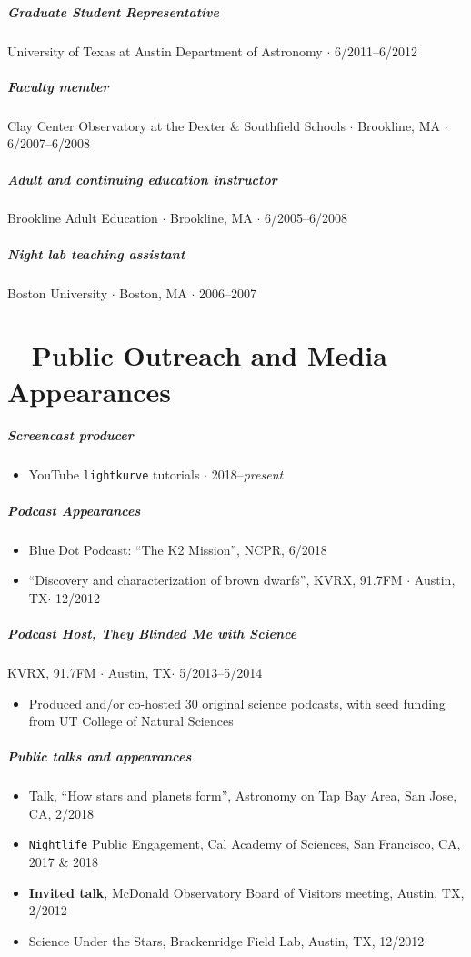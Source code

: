 \documentclass[10pt,letterpaper]{article}
\begin{document}
\subparagraph{Graduate Student Representative}
University of Texas at Austin Department of Astronomy $\cdot$ 6/2011--6/2012

\subparagraph{Faculty member}
Clay Center Observatory at the Dexter \& Southfield Schools  $\cdot$ Brookline, MA $\cdot$ 6/2007--6/2008

\subparagraph{Adult and continuing education instructor}
Brookline Adult Education  $\cdot$ Brookline, MA $\cdot$ 6/2005--6/2008

\subparagraph{Night lab teaching assistant}
Boston University $\cdot$ Boston, MA $\cdot$ 2006--2007

\section*{\faYoutubePlay ~ Public Outreach and Media Appearances}

\subparagraph{Screencast producer}
	\begin{itemize}
      \item YouTube \texttt{lightkurve} tutorials $\cdot$ 2018--\emph{present}
	\end{itemize}


\subparagraph{Podcast Appearances}
	\begin{itemize}
      \item Blue Dot Podcast: ``The K2 Mission'', NCPR, 6/2018
      \item ``Discovery and characterization of brown dwarfs'', KVRX, 91.7FM $\cdot$ Austin, TX$\cdot$ 12/2012
	\end{itemize}

\subparagraph{Podcast Host, \emph{They Blinded Me with Science} }
KVRX, 91.7FM $\cdot$ Austin, TX$\cdot$ 5/2013--5/2014
	\begin{itemize}
	    \item Produced and/or co-hosted 30 original science podcasts, with seed funding from UT College of Natural Sciences
	\end{itemize}

\subparagraph{Public talks and appearances}
	\begin{itemize}
    \item Talk, ``How stars and planets form'', Astronomy on Tap Bay Area, San Jose, CA, 2/2018
    \item \texttt{Nightlife} Public Engagement, Cal Academy of Sciences, San Francisco, CA, 2017 \& 2018
    \item \textbf{Invited talk}, McDonald Observatory Board of Visitors meeting, Austin, TX, 2/2012
    \item Science Under the Stars, Brackenridge Field Lab, Austin, TX, 12/2012
	\end{itemize}
\end{document}
